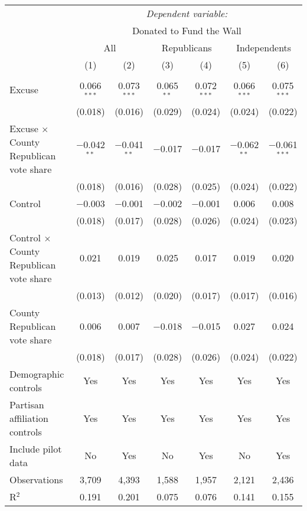 
\begin{table}[!htbp] \centering 
  \label{t:2-cityheterogeneity} 
\begin{threeparttable}
\begin{tabular}{@{\hspace{5pt}}l@{\hspace{5pt}}cccccc} 
\toprule 
 & \multicolumn{6}{c}{\textit{Dependent variable:}} \\ 
\cmidrule(rr){2-7} 
 & \multicolumn{6}{c}{Donated to Fund the Wall} \\ 
 \cmidrule(rr){2-7}
 & \multicolumn{2}{c}{All} & \multicolumn{2}{c}{Republicans} & \multicolumn{2}{c}{Independents} \\ 
 & (1) & (2) & (3) & (4) & (5) & (6)\\ 
\midrule  
\\[-2.1ex] Excuse & 0.066$^{***}$ & 0.073$^{***}$ & 0.065$^{**}$ & 0.072$^{***}$ & 0.066$^{***}$ & 0.075$^{***}$ \\ 
  & (0.018) & (0.016) & (0.029) & (0.024) & (0.024) & (0.022) \\ 
 \addlinespace 
 Excuse $\times$ County Republican vote share & $-$0.042$^{**}$ & $-$0.041$^{**}$ & $-$0.017 & $-$0.017 & $-$0.062$^{**}$ & $-$0.061$^{***}$ \\ 
  & (0.018) & (0.016) & (0.028) & (0.025) & (0.024) & (0.022) \\ 
 \addlinespace 
 Control & $-$0.003 & $-$0.001 & $-$0.002 & $-$0.001 & 0.006 & 0.008 \\ 
  & (0.018) & (0.017) & (0.028) & (0.026) & (0.024) & (0.023) \\ 
 \addlinespace 
 Control $\times$ County Republican vote share & 0.021 & 0.019 & 0.025 & 0.017 & 0.019 & 0.020 \\ 
  & (0.013) & (0.012) & (0.020) & (0.017) & (0.017) & (0.016) \\ 
 \addlinespace 
 County Republican vote share & 0.006 & 0.007 & $-$0.018 & $-$0.015 & 0.027 & 0.024 \\ 
  & (0.018) & (0.017) & (0.028) & (0.026) & (0.024) & (0.022) \\ 
 \addlinespace 
\midrule  
Demographic controls & Yes & Yes & Yes & Yes & Yes & Yes \\ 
Partisan affiliation controls & Yes & Yes & Yes & Yes & Yes & Yes \\ 
\midrule
Include pilot data & No & Yes & No & Yes & No & Yes \\
\addlinespace
Observations & 3,709 & 4,393 & 1,588 & 1,957 & 2,121 & 2,436 \\ 
R$^{2}$ & 0.191 & 0.201 & 0.075 & 0.076 & 0.141 & 0.155 \\ 
\bottomrule 
\end{tabular} 
\end{threeparttable}
\end{table} 
